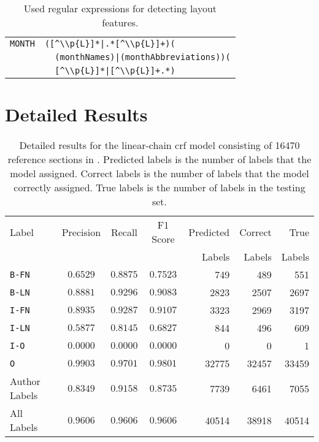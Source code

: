 \begin{table}[h!]
\begin{tabular}{l l}
   \texttt{MONTH}           &\verb$([^\\p{L}]*|.*[^\\p{L}]+)($\\
                            &\verb$  (monthNames)|(monthAbbreviations))($\\
                            &\verb$  [^\\p{L}]*|[^\\p{L}]+.*)$\\
  \bottomrule
\end{tabular}
\caption{Used regular expressions for detecting layout features.}
\label{tab:our-features-regular-expressions}
\end{table}

\clearpage

\section{Detailed Results}\label{app:detailed-results}

\begin{table}[h]
  \centering
\begin{tabular}{l c c c r r r}
\toprule
Label  & Precision  & Recall &  F1 Score & Predicted  &Correct  & True  \\
  &   &  &   &  Labels & Labels &  Labels \\
\midrule
\texttt{B-FN}  & $0.6529$  & $0.8875$ & $0.7523$ & \num{749}   & \num{489}     &     \num{551}  \\
\texttt{B-LN}  & $0.8881$  & $0.9296$ & $0.9083$ & \num{2823}  & \num{2507}    &     \num{2697} \\
\texttt{I-FN}  & $0.8935$  & $0.9287$ & $0.9107$ & \num{3323}  & \num{2969}    &     \num{3197} \\
\texttt{I-LN}  & $0.5877$  & $0.8145$ & $0.6827$ & \num{844}   & \num{496}     &     \num{609} \\
\texttt{I-O}   & $0.0000$  & $0.0000$ & $0.0000$ & \num{0}     & \num{0}       &     \num{1} \\
\texttt{O}     & $0.9903$  & $0.9701$ & $0.9801$ & \num{32775} & \num{32457}   &     \num{33459}\\
\midrule
Author Labels  & $0.8349$  & $0.9158$ & $0.8735$ & \num{7739}  & \num{6461}    &     \num{7055}\\
All Labels     & $0.9606$  & $0.9606$ & $0.9606$ & \num{40514} & \num{38918}   &     \num{40514}\\
\bottomrule
\end{tabular}
\caption{Detailed results for the \gls{linear-chain crf} model consisting of \num{16470} reference sections in . Predicted labels is the number of labels that the model assigned. Correct labels is the number of labels that the model correctly assigned. True labels is the number of labels in the testing set.}
\label{tab:detailed-results}
\end{table}

